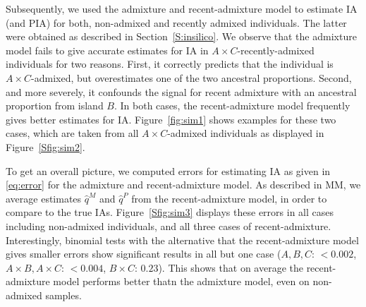 \documentclass[12pt]{article}
\theoremstyle{definition}
\begin{document}
Subsequently, we used the admixture and recent-admixture model to
estimate IA (and PIA) for both, non-admixed and recently admixed
individuals. The latter were obtained as described in
Section~\ref{S:insilico}. We observe that the admixture model fails to
give accurate estimates for IA in $A\times C$-recently-admixed
individuals for two reasons. First, it correctly predicts that the
individual is $A\times C$-admixed, but overestimates one of the two
ancestral proportions. Second, and more severely, it confounds the
signal for recent admixture with an ancestral proportion from island
$B$. In both cases, the recent-admixture model frequently gives better
estimates for IA. Figure~\ref{fig:sim1} shows examples for these two
cases, which are taken from all $A\times C$-admixed individuals as
displayed in Figure~\ref{Sfig:sim2}.

To get an overall picture, we computed errors for estimating IA as
given in \eqref{eq:error} for the admixture and recent-admixture
model. As described in MM, we average estimates $\hat q^M$ and
$\hat q^P$ from the recent-admixture model, in order to compare to the
true IAs. Figure~\ref{Sfig:sim3} displays these errors in all cases
including non-admixed individuals, and all three cases of
recent-admixture. Interestingly, binomial tests with the alternative
that the recent-admixture model gives smaller errors show significant
results in all but one case ($A, B, C$: $<0.002$,
$A\times B, A\times C$: $<0.004$, $B\times C$: $0.23$). This shows
that on average the recent-admixture model performs better thatn the
admixture model, even on non-admixed samples.
\end{document}
